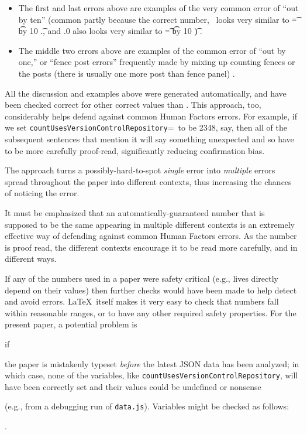 \documentclass[10pt,a4paper]{article}
\begin{document}
\begin{itemize}\raggedright
\item
The first and last errors above are examples of the very common error of ``out by ten'' (common partly because the correct number, \the\countUsesVersionControlRepository\ looks very similar to \t=\countUsesVersionControlRepository
\divide \t by 10
\the\t.\the\fraction, and \the\countUsesVersionControlRepository.0 also looks very similar to 
\t=\countUsesVersionControlRepository
\multiply \t by 10
\the\t) \cite{fixit}. 

\item
The middle two errors above are examples of the common error of ``out by one,'' or ``fence post errors'' frequently made by mixing up counting fences or the posts (there is usually one more post than fence panel) \cite{fixit}.
\end{itemize}

All the discussion and examples above were generated automatically, and have been checked correct for other correct values than \the\countUsesVersionControlRepository. This approach, too, considerably helps defend against common Human Factors errors. For example, if we set \texttt{\bslash countUsesVersionControlRepository}=\the\countUsesVersionControlRepository\ to be 2348, say, then all of the subsequent sentences that mention it will say something unexpected and so have to be more carefully proof-read, significantly reducing confirmation bias. \begin{change}The approach turns a possibly-hard-to-spot \emph{single\/} error into \emph{multiple\/} errors spread throughout the paper into different contexts, thus increasing the chances of noticing the error.

It must be emphasized that an automatically-guaranteed number that is supposed to be the same appearing in multiple different contexts is an extremely effective way of defending against common Human Factors errors. As the number is proof read, the different contexts encourage it to be read more carefully, and in different ways.
\end{change}

If any of the numbers used in a paper were safety critical (e.g., lives directly depend on their values) then further checks would have been made to help detect and avoid errors. \LaTeX\ itself makes it very easy to check that numbers fall within reasonable ranges, or to have any other required safety properties. For the present paper, a potential problem is \begin{change}if\end{change} the paper is mistakenly typeset \emph{before\/} the latest JSON data has been analyzed; in which case, none of the variables, like \texttt{\bslash countUsesVersionControlRepository}, will have been correctly set and their values could be undefined or nonsense \begin{change}(e.g., from a debugging run of \texttt{data.js}). Variables might be checked as follows:\end{change}.
\end{document}
